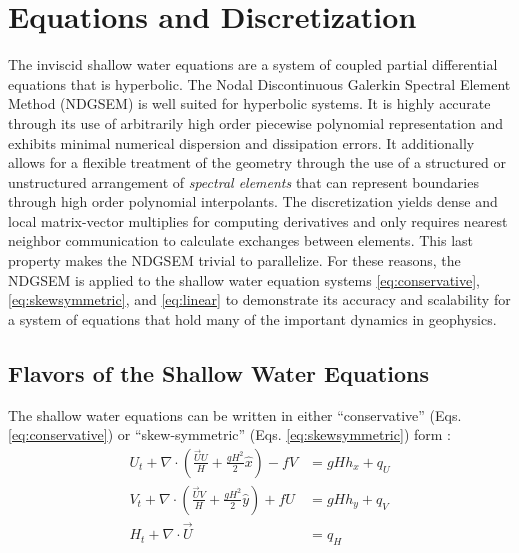 \documentclass{softwaremanual}
\begin{document}
\chapter{Equations and Discretization}
The inviscid shallow water equations are a system of coupled partial differential equations that is hyperbolic. The Nodal Discontinuous Galerkin Spectral Element Method (NDGSEM) is well suited for hyperbolic systems. It is highly accurate through its use of arbitrarily high order piecewise polynomial representation and exhibits minimal numerical dispersion and dissipation errors. It additionally allows for a flexible treatment of the geometry through the use of a structured or unstructured arrangement of \textit{spectral elements} that can represent boundaries through high order polynomial interpolants. The discretization yields dense and local matrix-vector multiplies for computing derivatives and only requires nearest neighbor communication to calculate exchanges between elements. This last property makes the NDGSEM trivial to parallelize. For these reasons, the NDGSEM is applied to the shallow water equation systems \eqref{eq:conservative}, \eqref{eq:skewsymmetric}, and \eqref{eq:linear} to demonstrate its accuracy and scalability for a system of equations that hold many of the important dynamics in geophysics. 

\section{Flavors of the Shallow Water Equations}
The shallow water equations can be written in either ``conservative'' (Eqs. \ref{eq:conservative}) or ``skew-symmetric'' (Eqs. \ref{eq:skewsymmetric}) form :
\begin{subequations}
\begin{align}
U_t  + \nabla \cdot \left( \frac{\vec{U}U}{H} + \frac{gH^2}{2}\hat{x} \right) - fV &= gHh_x  + q_U\\
V_t  + \nabla \cdot \left( \frac{\vec{U}V}{H} + \frac{gH^2}{2}\hat{y} \right) + fU &= gHh_y + q_V\\
H_t + \nabla \cdot \vec{U} &= q_H
\end{align}\label{eq:conservative}
\end{subequations}
\end{document}
